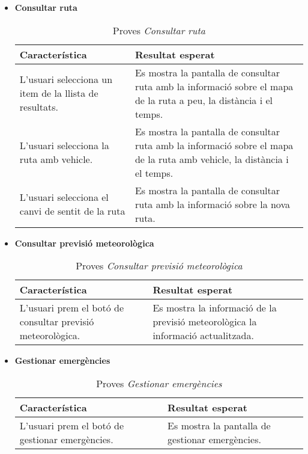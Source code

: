 \begin{itemize}
\item{}\textbf{Consultar ruta}

\begin{table}[!h]
\centering
\begin{tabular}{|T|T|}
\hline
\textbf{Característica} & \textbf{Resultat esperat} \\\hline
L'usuari selecciona un item de la llista de resultats. & Es mostra la pantalla de consultar ruta amb la informació sobre el mapa de la ruta a peu, la distància i el temps.\\\hline
L'usuari selecciona la ruta amb vehicle. & Es mostra la pantalla de consultar ruta amb la informació sobre el mapa de la ruta amb vehicle, la distància i el temps.\\\hline
L'usuari selecciona el canvi de sentit de la ruta & Es mostra la pantalla de consultar ruta amb la informació sobre la nova ruta.\\\hline
\end{tabular}
\label{}
\caption{Proves \textit{Consultar ruta}}
\end{table}

\item{}\textbf{Consultar previsió meteorològica}

\begin{table}[!h]
\centering
\begin{tabular}{|T|T|}
\hline
\textbf{Característica} & \textbf{Resultat esperat} \\\hline
L'usuari prem el botó de consultar previsió meteorològica. & Es mostra la informació de la previsió meteorològica la informació actualitzada.\\\hline
\end{tabular}
\label{}
\caption{Proves \textit{Consultar previsió meteorològica}}
\end{table}

\item{}\textbf{Gestionar emergències}

\begin{table}[!h]
\centering
\begin{tabular}{|T|T|}
\hline
\textbf{Característica} & \textbf{Resultat esperat} \\\hline
L'usuari prem el botó de gestionar emergències. & Es mostra la pantalla de gestionar emergències.\\\hline
\end{tabular}
\label{}
\caption{Proves \textit{Gestionar emergències}}
\end{table}


\end{itemize}
